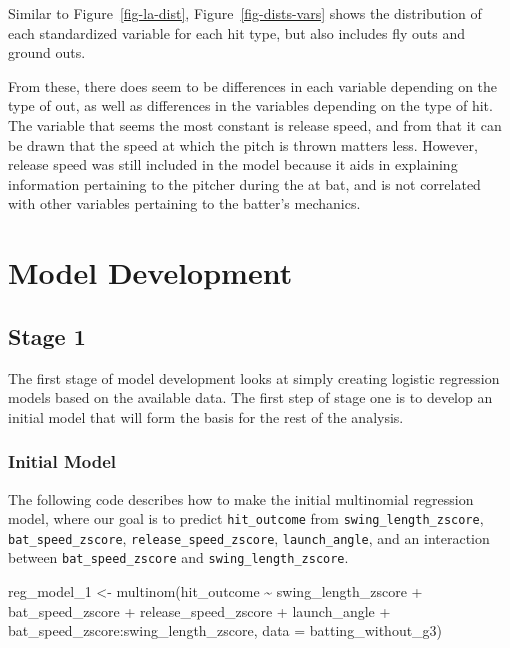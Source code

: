 \documentclass[
  letterpaper,
  DIV=11,
  numbers=noendperiod]{scrartcl}
\newenvironment{Shaded}{\begin{snugshade}}{\end{snugshade}}
\newcommand{\AttributeTok}[1]{\textcolor[rgb]{0.40,0.45,0.13}{#1}}
\newcommand{\FunctionTok}[1]{\textcolor[rgb]{0.28,0.35,0.67}{#1}}
\newcommand{\NormalTok}[1]{\textcolor[rgb]{0.00,0.23,0.31}{#1}}
\newcommand{\OtherTok}[1]{\textcolor[rgb]{0.00,0.23,0.31}{#1}}
\newcommand{\SpecialCharTok}[1]{\textcolor[rgb]{0.37,0.37,0.37}{#1}}
\begin{document}
Similar to Figure~\ref{fig-la-dist}, Figure~\ref{fig-dists-vars} shows
the distribution of each standardized variable for each hit type, but
also includes fly outs and ground outs.

From these, there does seem to be differences in each variable depending
on the type of out, as well as differences in the variables depending on
the type of hit. The variable that seems the most constant is release
speed, and from that it can be drawn that the speed at which the pitch
is thrown matters less. However, release speed was still included in the
model because it aids in explaining information pertaining to the
pitcher during the at bat, and is not correlated with other variables
pertaining to the batter's mechanics.

\section{Model Development}\label{model-development}

\subsection{Stage 1}\label{stage-1}

The first stage of model development looks at simply creating logistic
regression models based on the available data. The first step of stage
one is to develop an initial model that will form the basis for the rest
of the analysis.

\subsubsection{Initial Model}\label{initial-model}

The following code describes how to make the initial multinomial
regression model, where our goal is to predict \texttt{hit\_outcome}
from \texttt{swing\_length\_zscore}, \texttt{bat\_speed\_zscore},
\texttt{release\_speed\_zscore}, \texttt{launch\_angle}, and an
interaction between \texttt{bat\_speed\_zscore} and
\texttt{swing\_length\_zscore}.

\begin{Shaded}
\begin{Highlighting}[]
\NormalTok{reg\_model\_1 }\OtherTok{\textless{}{-}} \FunctionTok{multinom}\NormalTok{(hit\_outcome }\SpecialCharTok{\textasciitilde{}} 
\NormalTok{                     swing\_length\_zscore }\SpecialCharTok{+}
\NormalTok{                     bat\_speed\_zscore }\SpecialCharTok{+}
\NormalTok{                     release\_speed\_zscore }\SpecialCharTok{+}
\NormalTok{                     launch\_angle }\SpecialCharTok{+}
\NormalTok{                     bat\_speed\_zscore}\SpecialCharTok{:}\NormalTok{swing\_length\_zscore,}
                   \AttributeTok{data =}\NormalTok{ batting\_without\_g3) }
\end{Highlighting}
\end{Shaded}
\end{document}

